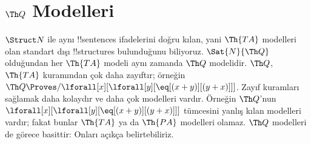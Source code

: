 \documentclass[../../../include/open-logic-section]{subfiles}
\begin{document}
\section{$\Th Q$ Modelleri}

\begin{explain}
$\Struct N$ ile aynı !!{sentence}s ifadelerini doğru kılan, yani
$\Th{TA}$ modelleri olan standart dışı !!{structure}s bulunduğunu
biliyoruz. $\Sat{N}{\Th Q}$ olduğundan her $\Th{TA}$ modeli aynı
zamanda $\Th Q$ modelidir. $\Th Q$, $\Th{TA}$ kuramından çok daha
zayıftır; örneğin
$\Th Q\Proves/\lforall[x][\lforall[y][\eq[(x+y)][(y+x)]]]$.
Zayıf kuramları sağlamak daha kolaydır ve daha çok modelleri vardır.
Örneğin $\Th Q$'nun
$\lforall[x][\lforall[y][\eq[(x+y)][(y+x)]]]$ tümcesini yanlış kılan
modelleri vardır; fakat bunlar $\Th{TA}$ ya da $\Th{PA}$ modelleri
olamaz. $\Th Q$ modelleri de görece basittir: Onları açıkça
belirtebiliriz.
\end{explain}
\end{document}

